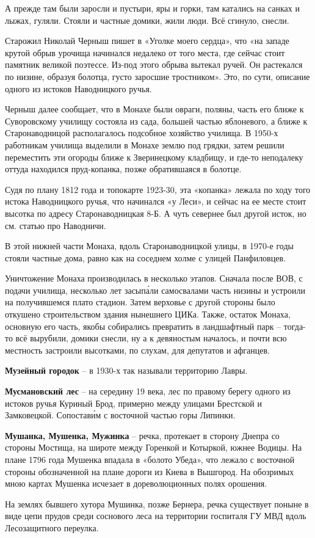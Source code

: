 А прежде там были заросли и пустыри, яры и горки, там катались на санках и лыжах, гуляли. Стояли и частные домики, жили люди. Всё сгинуло, снесли.

Старожил Николай Черныш пишет в «Уголке моего сердца», что «на западе крутой обрыв урочища начинался недалеко от того места, где сейчас стоит памятник великой поэтессе. Из-под этого обрыва вытекал ручей. Он растекался по низине, образуя болотца, густо заросшие тростником». Это, по сути, описание одного из истоков Наводницкого ручья.

Черныш далее сообщает, что в Монахе были овраги, поляны, часть его ближе к Суворовскому училищу состояла из сада, большей частью яблоневого, а ближе к Старонаводницой располагалось подсобное хозяйство училища. В 1950-х работникам училища выделили в Монахе землю под грядки, затем решили переместить эти огороды ближе к Зверинецкому кладбищу, и где-то неподалеку оттуда находился пруд-копанка, позже обратившаяся в болотце. 

Судя по плану 1812 года и топокарте 1923-30, эта «копанка» лежала по ходу того истока Наводницкого ручья, что начинался «у Леси», и сейчас на ее месте стоит высотка по адресу Старонаводницкая 8-Б. А чуть севернее был другой исток, но см. статью про Наводничи.

В этой нижней части Монаха, вдоль Старонаводницкой улицы, в 1970-е годы стояли частные дома, равно как на соседнем холме с улицей Панфиловцев. 

Уничтожение Монаха производилась в нес\-колько этапов. Сначала после ВОВ, с подачи училища, несколько лет засып\'али самосвалами часть низины и устроили на получившемся плато стадион. Затем верховье с другой стороны было откушено строительством здания нынешнего ЦИКа. Также, остаток Монаха, основную его часть, якобы собирались превратить в ландшафтный парк – тогда-то всё вырубили, домики снесли, ну а к девяностым началось, и почти всю местность застроили высотками, по слухам, для депутатов и афганцев.\\

\medskip

\textbf{Музейный городок} – в 1930-х так называли территорию Лавры.\\

\medskip

\textbf{Мусмановский лес} – на середину 19 века, лес по правому берегу одного из истоков ручья Куриный Брод, примерно между улицами Брестской и Замковецкой. Сопостав\'им с восточной частью горы Липинки.\\

\medskip

\textbf{Мушанка, Мушенка, Мужинка} – речка, протекает в сторону Днепра со стороны Мостища, на широте между Горенкой и Котыркой, южнее Водицы. 
На плане 1796 года Мушенка впадала в «болото Убеда», что лежало с восточной стороны обозначенной на плане дороги из Киева в Вышгород. На обозримых мною картах Мушенка исчезает в дореволюционных полях орошения. 

На землях бывшего хутора Мушинка, позже Бернера, речка существует поныне в виде цепи прудов среди соснового леса на территории госпиталя ГУ МВД вдоль Лесозащитного переулка.
